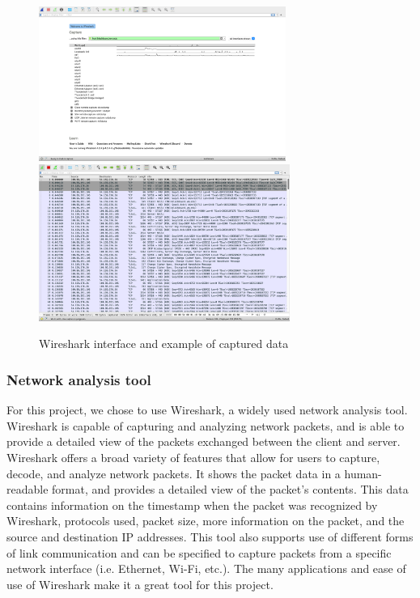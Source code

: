 \documentclass[10pt,sigconf,letterpaper,nonacm]{acmart}
\begin{document}
\begin{figure}[t]
  \centering
  \includegraphics[width=0.72\textwidth]{Figures_and_Graphs/WiresharkFigure.png}
  \includegraphics[width=0.73\textwidth]{Figures_and_Graphs/WiresharkDataFigure.png}
  \caption{Wireshark interface and example of captured data}
  \label{fig:Wireshark}
\end{figure}

\subsubsection{Network analysis tool} For this project, we chose to use Wireshark\cite{Wireshark}, a widely used network analysis tool. Wireshark is capable of capturing and analyzing network packets, and is able to provide a detailed
 view of the packets exchanged between the client and server. Wireshark offers a broad variety of features that allow for users to capture, decode, and analyze network packets. It shows the packet data in a human-readable format, and provides a detailed view of the packet's contents.
 This data contains information on the timestamp when the packet was recognized by Wireshark, protocols used, packet size, more information on the packet, and the source and destination IP addresses. This tool also supports use of different forms of link communication and can be specified to capture packets from a specific network interface (i.e. Ethernet, Wi-Fi, etc.). 
 The many applications and ease of use of Wireshark make it a great tool for this project.
 
\end{document}

